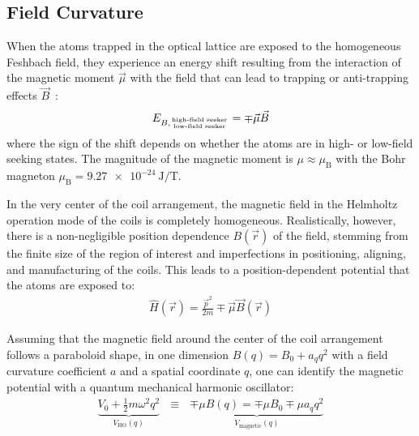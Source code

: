 \subsection*{Field Curvature}\label{ch:field_curvature_definition}
When the atoms trapped in the optical lattice are exposed to the homogeneous Feshbach field, they experience an energy shift resulting from the interaction of the magnetic moment $\vec \mu$ with the field that can lead to trapping or anti-trapping effects $\vec B$~\cite{pritchard_cooling_1983,gehm_properties_2003, hagemann_setup_2020}:
\begin{align}
    E_{B, {\text{high-field seeker} \atop \text{low-field seeker}}} = \mp \vec \mu \vec B
\end{align}
where the sign of the shift depends on whether the atoms are in high- or low-field seeking states. The magnitude of the magnetic moment is $\mu \approx \mu_\text{B}$ with the Bohr magneton $\mu_\text{B} = \SI{9.27e-24}{\joule\per\tesla}$.

In the very center of the coil arrangement, the magnetic field in the Helmholtz operation mode of the coils is completely homogeneous. Realistically, however, there is a non-negligible position dependence $B(\vec r)$ of the field, stemming from the finite size of the region of interest and imperfections in positioning, aligning, and manufacturing of the coils. This leads to a position-dependent potential that the atoms are exposed to:
\begin{align}
    \hat H(\vec r) = \frac{\vec p^2}{2m} \mp \vec \mu \vec B(\vec r)
\end{align}

Assuming that the magnetic field around the center of the coil arrangement follows a paraboloid shape, in one dimension $B(q) = B_0 + a_q q^2$ with a field curvature coefficient $a$ and a spatial coordinate $q$, one can identify the magnetic potential with a quantum mechanical harmonic oscillator:
\begin{align}
    \underbrace{V_0 + \frac{1}{2}m\omega^2q^2}_{V_\text{HO}(q)} ~~~\equiv~~~ \underbrace{\mp \mu B(q) = \mp \mu B_0 \mp \mu a_q q^2}_{V_\text{magnetic}(q)}
\end{align}

